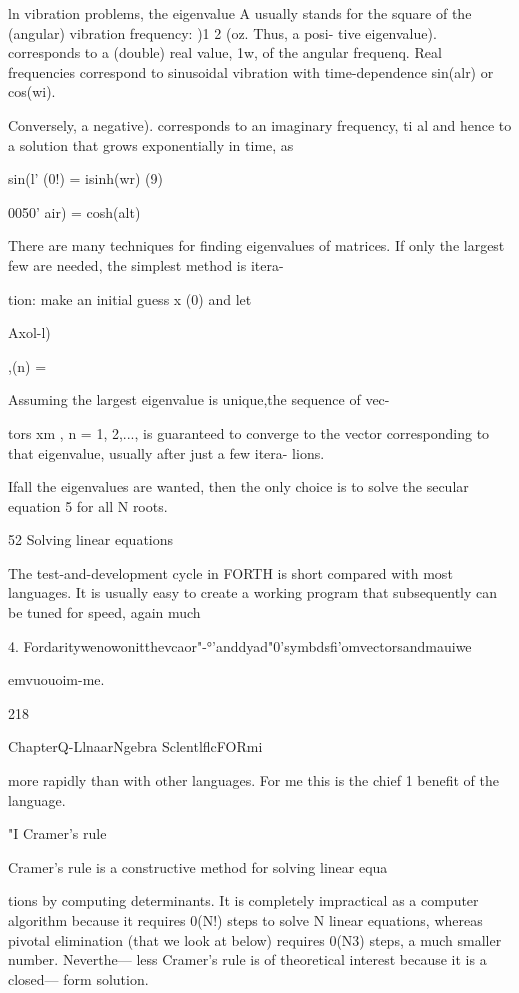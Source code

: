 {ln vibration problems, the eigenvalue A usually stands for the
square of the (angular) vibration frequency: )1 2 (oz. Thus, a posi-
tive eigenvalue). corresponds to a (double) real value, 1w, of the
angular frequenq. Real frequencies correspond to sinusoidal
vibration with time-dependence sin(alr) or cos(wi).

Conversely, a negative). corresponds to an imaginary frequency,
ti al and hence to a solution that grows exponentially in time, as

sin(l' (0!) = isinh(wr)
(9)

0050' air) = cosh(alt)

There are many techniques for finding eigenvalues of matrices.
If only the largest few are needed, the simplest method is itera-

tion: make an initial guess x (0) and let

Axol-l)

,(n) =

Assuming the largest eigenvalue is unique,the sequence of vec-

tors xm , n = 1, 2,..., is guaranteed to converge to the vector
corresponding to that eigenvalue, usually after just a few itera-
lions.

Ifall the eigenvalues are wanted, then the only choice is to solve
the secular equation 5 for all N roots.

52 Solving linear equations

The test-and-development cycle in FORTH is short compared
with most languages. It is usually easy to create a working
program that subsequently can be tuned for speed, again much

 

4. Fordaritywenowonitthevcaor"-°'anddyad"0'symbdsfi'omvectorsandmauiwe

emvuouoim-me.

218

ChapterQ-LlnaarNgebra SclentlflcFORmi

more rapidly than with other languages. For me this is the chief 1
benefit of the language.

"I Cramer's rule

Cramer's rule is a constructive method for solving linear equa

tions by computing determinants. It is completely impractical
as a computer algorithm because it requires 0(N!) steps to solve
N linear equations, whereas pivotal elimination (that we look at
below) requires 0(N3) steps, a much smaller number. Neverthe—
less Cramer's rule is of theoretical interest because it is a closed—
form solution.

}

